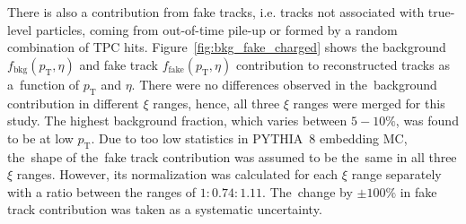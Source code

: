 There is also a contribution from fake tracks, i.e. tracks not associated with true-level particles, coming from out-of-time pile-up or  formed by a random combination of TPC hits. Figure~\ref{fig:bkg_fake_charged} shows the background $f_{\textrm{bkg}}\left(p_{\textrm{T}},\eta\right)$ and fake track $f_{\textrm{fake}}\left(p_{\textrm{T}},\eta\right)$ contribution to reconstructed tracks as a~function of $p_{\textrm{T}}$ and $\eta$. There were no differences observed in the~background contribution in different $\xi$ ranges, hence, all three $\xi$ ranges were merged for this study. The highest background fraction, which varies between $5-10\%$, was found to be at low $p_{\textrm{T}}$.  Due to too low statistics in PYTHIA~8 embedding \ac{MC}, the~shape of the~fake track contribution was assumed to be the~same in all three $\xi$ ranges. However, its normalization was calculated for each $\xi$ range separately with a ratio between the ranges of $1: 0.74: 1.11$.
The~change by $\pm100\%$ in fake track contribution was taken as a systematic uncertainty.




